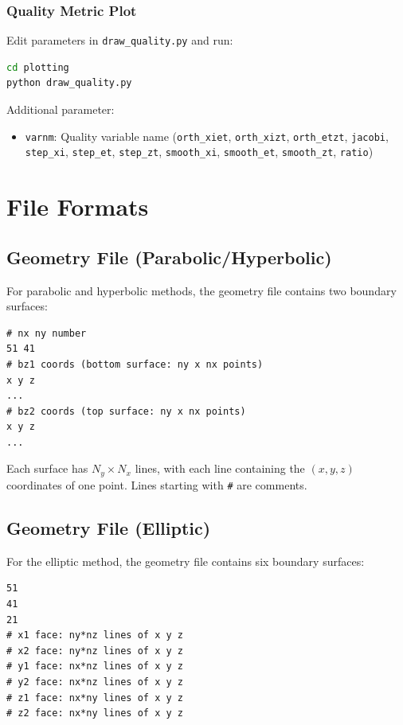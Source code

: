 \documentclass[11pt,a4paper]{report}
\begin{document}
\subsection{Quality Metric Plot}

Edit parameters in \texttt{draw\_quality.py} and run:
\begin{lstlisting}[language=bash]
cd plotting
python draw_quality.py
\end{lstlisting}

Additional parameter:
\begin{itemize}
    \item \texttt{varnm}: Quality variable name (\texttt{orth\_xiet}, \texttt{orth\_xizt}, \texttt{orth\_etzt}, \texttt{jacobi}, \texttt{step\_xi}, \texttt{step\_et}, \texttt{step\_zt}, \texttt{smooth\_xi}, \texttt{smooth\_et}, \texttt{smooth\_zt}, \texttt{ratio})
\end{itemize}

\appendix
\chapter{File Formats}

\section{Geometry File (Parabolic/Hyperbolic)}

For parabolic and hyperbolic methods, the geometry file contains two boundary surfaces:
\begin{lstlisting}[language={}]
# nx ny number
51 41
# bz1 coords (bottom surface: ny x nx points)
x y z
...
# bz2 coords (top surface: ny x nx points)
x y z
...
\end{lstlisting}

Each surface has $N_y \times N_x$ lines, with each line containing the $(x, y, z)$ coordinates of one point. Lines starting with \texttt{\#} are comments.

\section{Geometry File (Elliptic)}

For the elliptic method, the geometry file contains six boundary surfaces:
\begin{lstlisting}[language={}]
51
41
21
# x1 face: ny*nz lines of x y z
# x2 face: ny*nz lines of x y z
# y1 face: nx*nz lines of x y z
# y2 face: nx*nz lines of x y z
# z1 face: nx*ny lines of x y z
# z2 face: nx*ny lines of x y z
\end{lstlisting}
\end{document}
